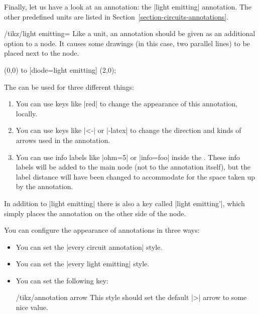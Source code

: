 Finally, let us have a look at an annotation: the |light emitting| annotation.
The other predefined units are listed in
Section~\ref{section-circuits-annotations}.

\begin{key}{/tikz/light emitting=}
    Like a unit, an annotation should be given as an additional option to a
    node. It causes some drawings (in this case, two parallel lines) to be
    placed next to the node.
\begin{codeexample}[]
 \draw (0,0) to [diode=light emitting] (2,0);
\end{codeexample}

    The  can be used for three different things:
    \begin{enumerate}
        \item You can use keys like |red| to change the appearance of this
            annotation, locally.
        \item You can use keys like |<-|  or |-latex| to change the direction
            and kinds of arrows used in the annotation.
        \item You can use info labels like |ohm=5| or |info=foo| inside the
            . These info labels will be added to the main node
            (not to the annotation itself), but the label distance will have
            been changed to accommodate for the space taken up by the
            annotation.
\begin{codeexample}[]
\end{codeexample}
    \end{enumerate}

    In addition to |light emitting| there is also a key called
    |light emitting'|, which simply places the annotation on the other side of
    the node.

    You can configure the appearance of annotations in three ways:
    \begin{itemize}
        \item You can set the |every circuit annotation| style.
        \item You can set the |every light emitting| style.
        \item You can set the following key:
            \begin{stylekey}{/tikz/annotation arrow}
                This style should set the default |>| arrow to some nice value.
            \end{stylekey}
    \end{itemize}
\end{key}

